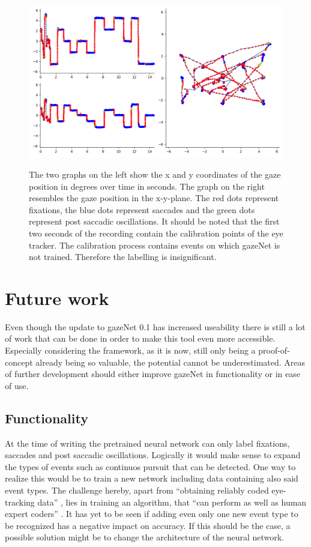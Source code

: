 \documentclass[conference]{IEEEtran}
\begin{document}
\begin{figure}
    \includegraphics[width=\linewidth]{Kreuze_Random Recording1_short}
    \label{fig:kreuze}
    \caption{The two graphs on the left show the x and y coordinates of the gaze position in degrees over time in seconds. The graph on the right resembles the gaze position in the x-y-plane. The red dots represent fixations, the blue dots represent saccades and the green dots represent post saccadic oscillations. It should be noted that the first two seconds of the recording contain the calibration points of the eye tracker. The calibration process contains events on which gazeNet is not trained. Therefore the labelling is insignificant.}
\end{figure}

\section{Future work}
Even though the update to gazeNet 0.1 has increased useability there is still a lot of work that can be done in order to make this tool even more accessible. Especially considering the framework, as it is now, still only being a proof-of-concept already being so valuable, the potential cannot be underestimated. Areas of further development should either improve gazeNet in functionality or in ease of use.

\subsection{Functionality}
At the time of writing the pretrained neural network can only label fixations, saccades and post saccadic oscillations. Logically it would make sense to expand the types of events such as continuos pursuit that can be detected. One way to realize this would be to train a new network including data containing also said event types. The challenge hereby, apart from ``obtaining reliably coded eye-tracking data'' \citet{zemblys2018gazeNet}, lies in training an algorithm, that ``can perform as well as human expert coders'' \citet{zemblys2018gazeNet}. It has yet to be seen if adding even only one new event type to be recognized has a negative impact on accuracy. If this should be the case, a possible solution might be to change the architecture of the neural network.
\end{document}
